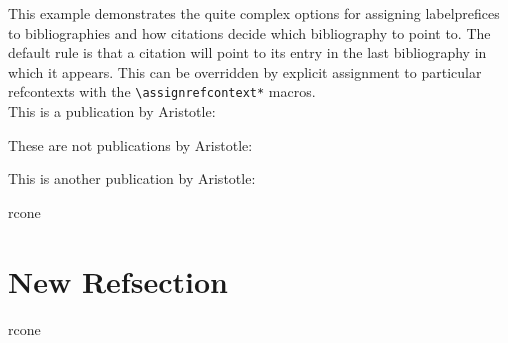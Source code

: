 \documentclass[a4paper]{article}
\newcommand{\cmd}[1]{\texttt{\textbackslash #1}}
\begin{document}
This example demonstrates the quite complex options for assigning
labelprefices to bibliographies and how citations decide which bibliography
to point to. The default rule is that a citation will point to its entry in
the last bibliography in which it appears. This can be overridden by
explicit assignment to particular refcontexts with the
\cmd{assignrefcontext*} macros.\\


This is a publication by Aristotle:
\cite{aristotle:anima} %

These are not publications by Aristotle:
\cite{yoon} %
\cite{worman} %
\cite{piccato} %
\cite{nussbaum} %

This is another publication by Aristotle:
\cite{aristotle:physics} %

\begin{refcontext}{rcone}
\printbibliography[keyword=primary, title={Aristotle Publications}]
\end{refcontext}

\printbibliography[notkeyword=primary, title={Other publications}]
\endrefcontext

\begin{refcontext}[labelprefix=Q]
\printbibliography[filter=cats, title={Other publications}]
\end{refcontext}

\begin{refcontext}[sorting=nty]
\printbibliography[resetnumbers, notkeyword=primary, title={More Other publications}]
\cite{nussbaum} %
\end{refcontext}

\section*{New Refsection}
\newrefsection
\cite{worman} %
\begin{refcontext}[labelprefix=T]{rcone}
\printbibliography[resetnumbers, notkeyword=primary, title={More Other publications}]
\end{refcontext}
\end{document}
